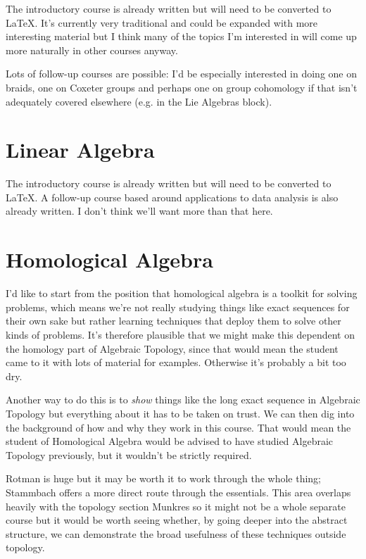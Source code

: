 \documentclass[article]{article}
\begin{document}
The introductory course is already written but will need to be converted to \LaTeX. It's currently very traditional and could be expanded with more interesting material but I think many of the topics I'm interested in will come up more naturally in other courses anyway.

Lots of follow-up courses are possible: I'd be especially interested in doing one on braids, one on Coxeter groups and perhaps one on group cohomology if that isn't adequately covered elsewhere (e.g. in the Lie Algebras block).

\section{Linear Algebra}

The introductory course is already written but will need to be converted to \LaTeX. A follow-up course based around applications to data analysis is also already written. I don't think we'll want more than that here.

\section{Homological Algebra}

I'd like to start from the position that homological algebra is a toolkit for solving problems, which means we're not really studying things like exact sequences for their own sake but rather learning techniques that deploy them to solve other kinds of problems. It's therefore plausible that we might make this dependent on the homology part of Algebraic Topology, since that would mean the student came to it with lots of material for examples. Otherwise it's probably a bit too dry.

Another way to do this is to \emph{show} things like the long exact sequence in Algebraic Topology but everything about it has to be taken on trust. We can then dig into the background of how and why they work in this course. That would mean the student of Homological Algebra would be advised to have studied Algebraic Topology previously, but it wouldn't be strictly required.

Rotman is huge but it may be worth it to work through the whole thing; Stammbach offers a more direct route through the essentials. This area overlaps heavily with the topology section Munkres so it might not be a whole separate course but it would be worth seeing whether, by going deeper into the abstract structure, we can demonstrate the broad usefulness of these techniques outside topology.
\end{document}
